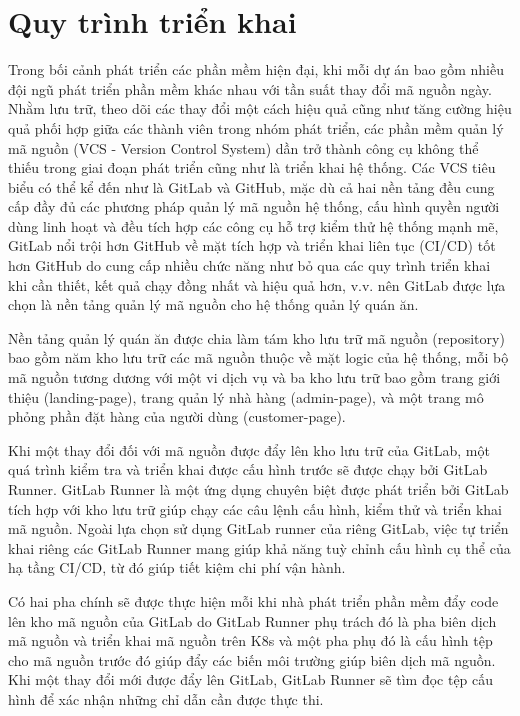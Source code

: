 \section{Quy trình triển khai}\label{sec:deploy-environment}
Trong bối cảnh phát triển các phần mềm hiện đại, khi mỗi dự án bao gồm nhiều đội ngũ phát triển phần mềm khác nhau với tần suất thay đổi mã nguồn ngày.
Nhằm lưu trữ, theo dõi các thay đổi một cách hiệu quả cũng như tăng cường hiệu quả phối hợp giữa các thành viên trong nhóm phát triển, các phần mềm quản lý mã nguồn (VCS - Version Control System) dần trở thành công cụ không thể thiếu trong giai đoạn phát triển cũng như là triển khai hệ thống.
Các VCS tiêu biểu có thể kể đến như là GitLab và GitHub, mặc dù cả hai nền tảng đều cung cấp đầy đủ các phương pháp quản lý mã nguồn hệ thống, cấu hình quyền người dùng linh hoạt và đều tích hợp các công cụ hỗ trợ kiểm thử hệ thống mạnh mẽ, GitLab nổi trội hơn GitHub về mặt tích hợp và triển khai liên tục (CI/CD) tốt hơn GitHub do cung cấp nhiều chức năng như bỏ qua các quy trình triển khai khi cần thiết, kết quả chạy đồng nhất và hiệu quả hơn, v.v. nên GitLab được lựa chọn là nền tảng quản lý mã nguồn cho hệ thống quản lý quán ăn.

Nền tảng quản lý quán ăn được chia làm tám kho lưu trữ mã nguồn (repository) bao gồm năm kho lưu trữ các mã nguồn thuộc về mặt logic của hệ thống, mỗi bộ mã nguồn tương dương với một vi dịch vụ và ba kho lưu trữ bao gồm trang giới thiệu (landing-page), trang quản lý nhà hàng (admin-page), và một trang mô phỏng phần đặt hàng của người dùng (customer-page).

Khi một thay đổi đối với mã nguồn được đẩy lên kho lưu trữ của GitLab, một quá trình kiểm tra và triển khai được cấu hình trước sẽ được chạy bởi GitLab Runner.
GitLab Runner là một ứng dụng chuyên biệt được phát triển bởi GitLab tích hợp với kho lưu trữ giúp chạy các câu lệnh cấu hình, kiểm thử và triển khai mã nguồn.
Ngoài lựa chọn sử dụng GitLab runner của riêng GitLab, việc tự triển khai riêng các GitLab Runner mang giúp khả năng tuỳ chỉnh cấu hình cụ thể của hạ tầng CI/CD, từ đó giúp tiết kiệm chi phí vận hành.

Có hai pha chính sẽ được thực hiện mỗi khi nhà phát triển phần mềm đẩy code lên kho mã nguồn của GitLab do GitLab Runner phụ trách đó là pha biên dịch mã nguồn và triển khai mã nguồn trên K8s và một pha phụ đó là cấu hình tệp  cho mã nguồn trước đó giúp đẩy các biến môi trường giúp biên dịch mã nguồn.
Khi một thay đổi mới được đẩy lên GitLab, GitLab Runner sẽ tìm đọc tệp cấu hình  để xác nhận những chỉ dẫn cần được thực thi.

